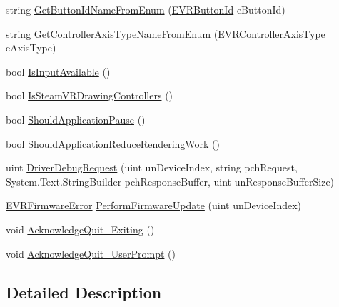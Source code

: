 \begin{DoxyCompactItemize}
\item 
string \mbox{\hyperlink{class_valve_1_1_v_r_1_1_c_v_r_system_acf572436320e18e574af8435fdb34c7a}{Get\+Button\+Id\+Name\+From\+Enum}} (\mbox{\hyperlink{namespace_valve_1_1_v_r_a43fd11be1f2f7596cbb480b4a5dc2e87}{E\+V\+R\+Button\+Id}} e\+Button\+Id)
\item 
string \mbox{\hyperlink{class_valve_1_1_v_r_1_1_c_v_r_system_a67582b56e89890437a482f7259920ba8}{Get\+Controller\+Axis\+Type\+Name\+From\+Enum}} (\mbox{\hyperlink{namespace_valve_1_1_v_r_aaccda1681e581ff46f9d883a8b574a66}{E\+V\+R\+Controller\+Axis\+Type}} e\+Axis\+Type)
\item 
bool \mbox{\hyperlink{class_valve_1_1_v_r_1_1_c_v_r_system_a911d8daa1d9b5d2d8cc9b7e36399187e}{Is\+Input\+Available}} ()
\item 
bool \mbox{\hyperlink{class_valve_1_1_v_r_1_1_c_v_r_system_a7f9a259b909f4dc21263352a3d122806}{Is\+Steam\+V\+R\+Drawing\+Controllers}} ()
\item 
bool \mbox{\hyperlink{class_valve_1_1_v_r_1_1_c_v_r_system_a5bdcaf6bcb7f5f0e2564033e5df476d9}{Should\+Application\+Pause}} ()
\item 
bool \mbox{\hyperlink{class_valve_1_1_v_r_1_1_c_v_r_system_a726687af31f242f9df5ea5a073150b8e}{Should\+Application\+Reduce\+Rendering\+Work}} ()
\item 
uint \mbox{\hyperlink{class_valve_1_1_v_r_1_1_c_v_r_system_acf1684d0053050eb05eb90e912900142}{Driver\+Debug\+Request}} (uint un\+Device\+Index, string pch\+Request, System.\+Text.\+String\+Builder pch\+Response\+Buffer, uint un\+Response\+Buffer\+Size)
\item 
\mbox{\hyperlink{namespace_valve_1_1_v_r_a07c3927041d6bb490e61ca27612c41ff}{E\+V\+R\+Firmware\+Error}} \mbox{\hyperlink{class_valve_1_1_v_r_1_1_c_v_r_system_a807bef2cd4ed9817b4f1bfe06fafe6f9}{Perform\+Firmware\+Update}} (uint un\+Device\+Index)
\item 
void \mbox{\hyperlink{class_valve_1_1_v_r_1_1_c_v_r_system_ae9ec4861e040d13c4e5559e787e1a404}{Acknowledge\+Quit\+\_\+\+Exiting}} ()
\item 
void \mbox{\hyperlink{class_valve_1_1_v_r_1_1_c_v_r_system_af777d49b28018b5f715a383136738d9b}{Acknowledge\+Quit\+\_\+\+User\+Prompt}} ()
\end{DoxyCompactItemize}


\subsection{Detailed Description}


